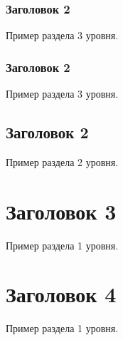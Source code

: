 \documentclass[../main]{subfiles}
\begin{document}
\subsubsection{Заголовок 2}
Пример раздела 3 уровня.

\subsubsection{Заголовок 2}
Пример раздела 3 уровня.

\subsection{Заголовок 2}
Пример раздела 2 уровня.

\section{Заголовок 3}
Пример раздела 1 уровня.

\section{Заголовок 4}
Пример раздела 1 уровня.
\end{document}

